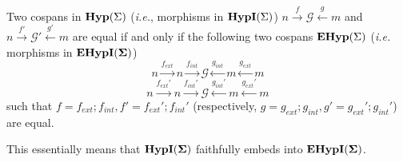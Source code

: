 \begin{proposition}
    Two cospans in $\mathbf{Hyp}(\Sigma)$ (\textit{i.e.}, morphisms in $\textbf{HypI}(\Sigma)$) $n \xrightarrow{f} \mathcal{G} \xleftarrow{g} m$ and $n \xrightarrow{f'} \mathcal{G}' \xleftarrow{g'} m$ are equal if and only if
    the following two cospans  $\mathbf{EHyp}(\Sigma)$ (\textit{i.e.} morphisms in ${\mathbf{EHypI(\Sigma)}}$)
    \[
    n \xrightarrow{f_{ext}} n \xrightarrow{f_{int}} \mathcal{G} \xleftarrow{g_{int}} m \xleftarrow{g_{ext}} m
    \]
    \[
        n \xrightarrow{f_{ext}'} n \xrightarrow{f_{int}'} \mathcal{G} \xleftarrow{g_{int}'} m \xleftarrow{g_{ext}'} m    
    \]
    such that $f = f_{ext};f_{int}, f'=f_{ext}';f_{int}'$ (respectively, $g = g_{ext};g_{int}, g' = g_{ext}';g_{int}'$) are equal.
\end{proposition}
This essentially means that $\mathbf{\textbf{HypI}(\Sigma)}$ faithfully embeds into ${\mathbf{EHypI(\Sigma)}}$. 

